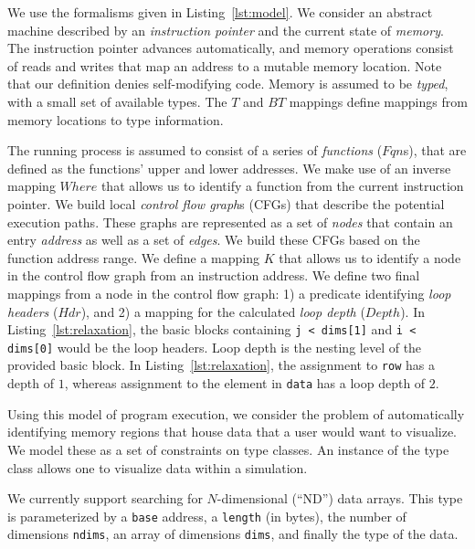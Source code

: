 We use the formalisms given in Listing~\ref{lst:model}.  We consider an
abstract machine described by an
\textit{instruction pointer} and the current state of
\textit{memory}.
The instruction pointer advances automatically, and memory
operations consist of reads and writes that map an address to a mutable memory
location.
Note that our definition denies self-modifying code.  Memory is assumed to be
\emph{typed}, with a small set of available types.  The $T$ and $BT$ mappings
define mappings from memory locations to type information.

The running process is assumed to consist of a series of
\textit{functions} ($Fqn$s), that are defined as the functions' upper and
lower addresses.  We make use of an inverse mapping $Where$ that
allows us to identify a function from the
current instruction pointer.
We build local \textit{control flow graph}s (CFGs) that describe the potential
execution paths.  These graphs are represented as a set of \textit{nodes} that
contain an entry \textit{address} as well as a set of \textit{edges}.
We build these CFGs based on the function address range.  We define a
mapping $K$ that allows us to identify a node in the control flow graph
from an instruction address.  We define two final mappings from a node
in the control flow graph: 1)
a predicate identifying \textit{loop headers} ($Hdr$), and 2) a mapping for the
calculated \textit{loop depth} ($Depth$).  In
Listing~\ref{lst:relaxation},
the basic blocks containing \texttt{j < dims[1]} and \texttt{i <
dims[0]} would be the loop headers.  Loop depth is the nesting level of
the provided basic block.  In Listing~\ref{lst:relaxation}, the
assignment to \texttt{row} has a depth of $1$, whereas assignment to
the
element in \texttt{data} has a loop depth of $2$.

Using this model of program execution, we consider the problem of
automatically identifying memory regions that house data that a user
would want to visualize.  We model these as a set of constraints on
type classes.  An instance of the type class allows one to visualize
data within a simulation.

We currently support searching for $N$-dimensional (``ND'') data
arrays.
This type is parameterized by a \texttt{base} address, a
\texttt{length} (in bytes), the number of
dimensions \texttt{ndims}, an array of dimensions \texttt{dims}, and
finally the type of the data.

